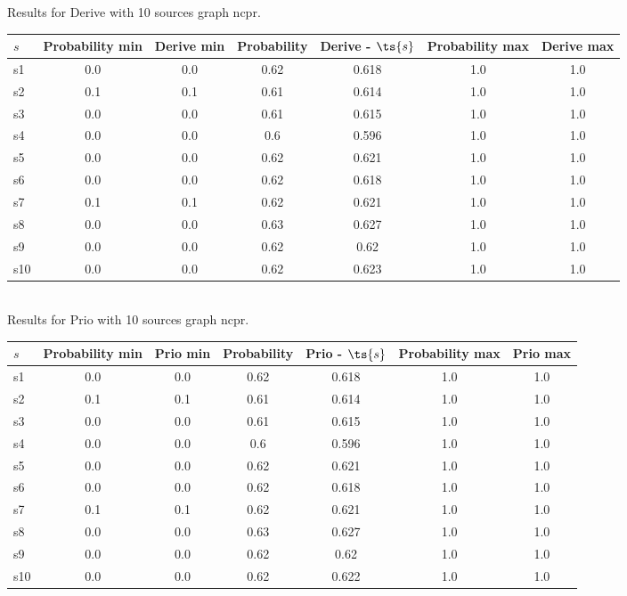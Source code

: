 \documentclass{article}
\begin{document}
\noindent Results for Derive with 10 sources graph ncpr.

\noindent\begin{tabular}{|l|c|c|c|c|c|c|}
\hline
$s$& Probability min & Derive min & Probability & Derive - $\ts{s}$ & Probability max & Derive max\\
\hline
s1 &0.0 & 0.0 & 0.62 & 0.618 & 1.0 & 1.0\\
\hline
s2 &0.1 & 0.1 & 0.61 & 0.614 & 1.0 & 1.0\\
\hline
s3 &0.0 & 0.0 & 0.61 & 0.615 & 1.0 & 1.0\\
\hline
s4 &0.0 & 0.0 & 0.6 & 0.596 & 1.0 & 1.0\\
\hline
s5 &0.0 & 0.0 & 0.62 & 0.621 & 1.0 & 1.0\\
\hline
s6 &0.0 & 0.0 & 0.62 & 0.618 & 1.0 & 1.0\\
\hline
s7 &0.1 & 0.1 & 0.62 & 0.621 & 1.0 & 1.0\\
\hline
s8 &0.0 & 0.0 & 0.63 & 0.627 & 1.0 & 1.0\\
\hline
s9 &0.0 & 0.0 & 0.62 & 0.62 & 1.0 & 1.0\\
\hline
s10 &0.0 & 0.0 & 0.62 & 0.623 & 1.0 & 1.0\\
\hline
\end{tabular}\\

\noindent Results for Prio with 10 sources graph ncpr.

\noindent\begin{tabular}{|l|c|c|c|c|c|c|}
\hline
$s$& Probability min & Prio min & Probability & Prio - $\ts{s}$ & Probability max & Prio max\\
\hline
s1 &0.0 & 0.0 & 0.62 & 0.618 & 1.0 & 1.0\\
\hline
s2 &0.1 & 0.1 & 0.61 & 0.614 & 1.0 & 1.0\\
\hline
s3 &0.0 & 0.0 & 0.61 & 0.615 & 1.0 & 1.0\\
\hline
s4 &0.0 & 0.0 & 0.6 & 0.596 & 1.0 & 1.0\\
\hline
s5 &0.0 & 0.0 & 0.62 & 0.621 & 1.0 & 1.0\\
\hline
s6 &0.0 & 0.0 & 0.62 & 0.618 & 1.0 & 1.0\\
\hline
s7 &0.1 & 0.1 & 0.62 & 0.621 & 1.0 & 1.0\\
\hline
s8 &0.0 & 0.0 & 0.63 & 0.627 & 1.0 & 1.0\\
\hline
s9 &0.0 & 0.0 & 0.62 & 0.62 & 1.0 & 1.0\\
\hline
s10 &0.0 & 0.0 & 0.62 & 0.622 & 1.0 & 1.0\\
\hline
\end{tabular}\\
\end{document}
